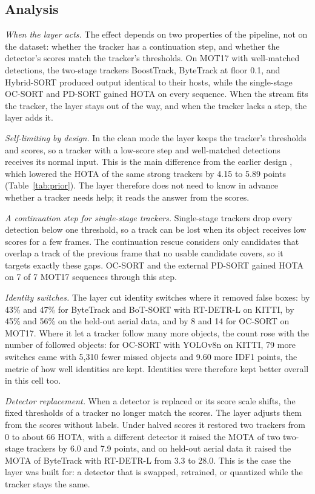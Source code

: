 \subsection{Analysis}\label{sec:discussion}

\emph{When the layer acts.} The effect depends on two properties of the
pipeline, not on the dataset: whether the tracker has a continuation step,
and whether the detector's scores match the tracker's thresholds. On MOT17
with well-matched detections, the two-stage trackers BoostTrack, ByteTrack at
floor 0.1, and Hybrid-SORT produced output identical to their hosts, while
the single-stage OC-SORT and PD-SORT gained HOTA on every sequence. When the
stream fits the tracker, the layer stays out of the way, and when the
tracker lacks a step, the layer adds it.

\emph{Self-limiting by design.} In the clean mode the layer keeps the
tracker's thresholds and scores, so a tracker with a low-score step and
well-matched detections receives its normal input. This is the main
difference from the earlier design \aob{}, which lowered the HOTA of the same
strong trackers by 4.15 to 5.89 points (Table~\ref{tab:prior}). The layer
therefore does not need to know in advance whether a tracker needs help; it
reads the answer from the scores.

\emph{A continuation step for single-stage trackers.} Single-stage trackers
drop every detection below one threshold, so a track can be lost when its
object receives low scores for a few frames. The continuation rescue
considers only candidates that overlap a track of the previous frame that no
usable candidate covers, so it targets exactly these gaps. OC-SORT and the
external PD-SORT gained HOTA on 7 of 7 MOT17 sequences through this step.

\emph{Identity switches.} The layer cut identity switches where it removed
false boxes: by 43\% and 47\% for ByteTrack and BoT-SORT with RT-DETR-L on
KITTI, by 45\% and 56\% on the held-out aerial data, and by 8 and 14 for
OC-SORT on MOT17. Where it let a tracker follow many more objects, the count
rose with the number of followed objects: for OC-SORT with YOLOv8n on KITTI,
79 more switches came with 5,310 fewer missed objects and 9.60 more IDF1
points, the metric of how well identities are kept. Identities were
therefore kept better overall in this cell too.

\emph{Detector replacement.} When a detector is replaced or its score scale
shifts, the fixed thresholds of a tracker no longer match the scores. The
layer adjusts them from the scores without labels. Under halved scores it
restored two trackers from 0 to about 66 HOTA, with a different detector
it raised the MOTA of two two-stage trackers by 6.0 and 7.9 points, and on
held-out aerial data it raised the MOTA of ByteTrack with RT-DETR-L from 3.3
to 28.0. This is
the case the layer was built for: a detector that is swapped, retrained, or
quantized while the tracker stays the same.


